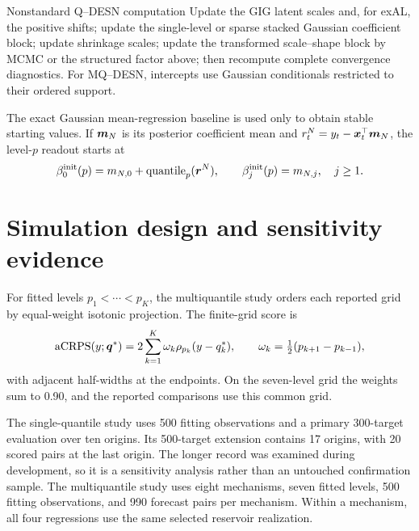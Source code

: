 \begin{algorithmblock}{Nonstandard Q--DESN computation}
Update the GIG latent scales and, for exAL, the positive shifts; update the
single-level or sparse stacked Gaussian coefficient block; update shrinkage
scales; update the transformed scale--shape block by MCMC or the structured
factor above; then recompute complete convergence diagnostics. For MQ--DESN,
intercepts use Gaussian conditionals restricted to their ordered support.
\end{algorithmblock}

The exact Gaussian mean-regression baseline is used only to obtain stable
starting values. If \(\boldsymbol{m}_N\) is its posterior coefficient mean and
\(r_t^N=y_t-\boldsymbol{x}_t^\top\boldsymbol{m}_N\), the level-\(p\) readout starts at
\[
\beta_0^{\mathrm{init}}(p)=m_{N,0}+\operatorname{quantile}_p(\boldsymbol{r}^N),
\qquad
\beta_j^{\mathrm{init}}(p)=m_{N,j},\quad j\ge1.
\]

\section{Simulation design and sensitivity evidence}
\label{app:qdesn-simulation-support}

For fitted levels \(p_1<\cdots<p_K\), the multiquantile study orders each
reported grid by equal-weight isotonic projection. The finite-grid score is
\[
\operatorname{aCRPS}(y;\boldsymbol{q}^*)=2\sum_{k=1}^K\omega_k
\rho_{p_k}(y-q_k^*),
\qquad
\omega_k=\tfrac12(p_{k+1}-p_{k-1}),
\]
with adjacent half-widths at the endpoints. On the seven-level grid the
weights sum to 0.90, and the reported comparisons use this common grid.

The single-quantile study uses 500 fitting observations and a primary
300-target evaluation over ten origins. Its 500-target extension contains
17 origins, with 20 scored pairs at the last origin. The longer record was
examined during development, so it is a sensitivity analysis rather than an
untouched confirmation sample. The multiquantile study uses eight mechanisms,
seven fitted levels, 500 fitting observations, and 990 forecast pairs per
mechanism. Within a mechanism, all four regressions use the same selected
reservoir realization.

